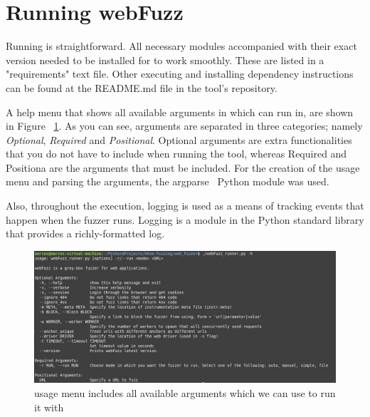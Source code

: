 \section{Running webFuzz}
Running \pname{} is straightforward. All necessary modules accompanied with their exact version needed to be installed for \pname{} to work smoothly. These are listed in a "requirements" text file. Other executing and installing dependency instructions can be found at the README.md file in the tool's repository.

A help menu that shows all available arguments in which \pname{} can run in, are shown in Figure ~\ref{fig:argparser_menu}. As you can see, arguments are separated in three categories; namely \emph{Optional}, \emph{Required} and \emph{Positional}. Optional arguments are extra functionalities that you do not have to include when running the tool, whereas Required and Positiona are the arguments that must be included. For the creation of the usage menu and parsing the arguments, the argparse~\cite{argparse} Python module was used.

Also, throughout the execution, logging is used as a means of tracking events that happen when the fuzzer runs. Logging is a module in the Python standard library that provides a richly-formatted log.

\begin{figure}[ht]
 \centering
 \captionsetup{justification=centering}
 \includegraphics[width=\linewidth]{figures/argparser_menu.jpg}
 \caption[\pname{} usage menu]{\pname{} usage menu includes all available arguments which we can use to run it with}
 \label{fig:argparser_menu}
\end{figure}

